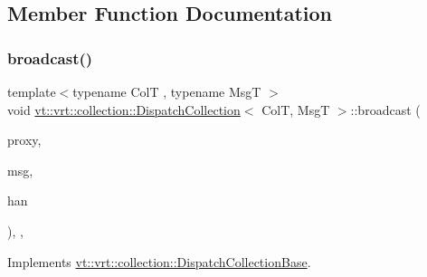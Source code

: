 \subsection{Member Function Documentation}
\mbox{\label{structvt_1_1vrt_1_1collection_1_1_dispatch_collection_a3f109eb8fdd56e3292b674243996bca4}} 
\subsubsection{\texorpdfstring{broadcast()}{broadcast()}}
{\footnotesize\ttfamily template$<$typename ColT , typename MsgT $>$ \\
void \hyperlink{structvt_1_1vrt_1_1collection_1_1_dispatch_collection}{vt\+::vrt\+::collection\+::\+Dispatch\+Collection}$<$ ColT, MsgT $>$\+::broadcast (\begin{DoxyParamCaption}\item[{\hyperlink{namespacevt_a1b417dd5d684f045bb58a0ede70045ac}{Virtual\+Proxy\+Type}}]{proxy,  }\item[{void $\ast$}]{msg,  }\item[{\hyperlink{namespacevt_af64846b57dfcaf104da3ef6967917573}{Handler\+Type}}]{han }\end{DoxyParamCaption})\hspace{0.3cm}{\ttfamily [override]}, {\ttfamily [private]}, {\ttfamily [virtual]}}



Implements \hyperlink{structvt_1_1vrt_1_1collection_1_1_dispatch_collection_base_a339eda5b1ee045a9ec400d34bf91ac97}{vt\+::vrt\+::collection\+::\+Dispatch\+Collection\+Base}.

\mbox{\label{structvt_1_1vrt_1_1collection_1_1_dispatch_collection_a4ecf34d64875a926061d3bec61f24871}} 
